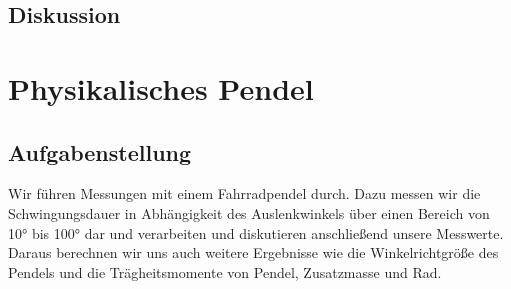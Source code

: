 \documentclass{article}
\begin{document}
\subsection{Diskussion}
\section{Physikalisches Pendel}
\subsection{Aufgabenstellung}
Wir führen Messungen mit einem Fahrradpendel durch. Dazu messen wir die Schwingungsdauer in Abhängigkeit des Auslenkwinkels über einen Bereich von 10° bis 100° dar und verarbeiten und diskutieren anschließend unsere Messwerte. 
Daraus berechnen wir uns auch weitere Ergebnisse wie die Winkelrichtgröße des Pendels und die Trägheitsmomente von Pendel, Zusatzmasse und Rad. 
\end{document}
